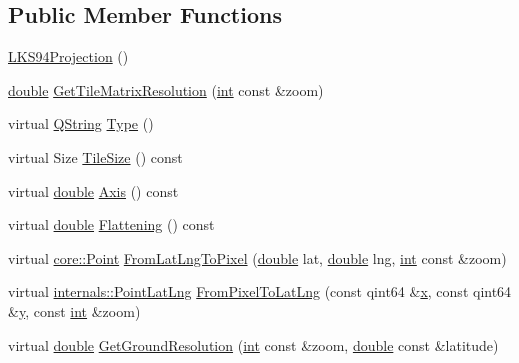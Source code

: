 \subsection*{Public Member Functions}
\begin{DoxyCompactItemize}
\item 
\hyperlink{group___o_p_map_widget_gacf511403f6a470bec942524c0e020b77}{L\-K\-S94\-Projection} ()
\item 
\hyperlink{_super_l_u_support_8h_a8956b2b9f49bf918deed98379d159ca7}{double} \hyperlink{group___o_p_map_widget_gade26ff9888d408a201247708930b7def}{Get\-Tile\-Matrix\-Resolution} (\hyperlink{ioapi_8h_a787fa3cf048117ba7123753c1e74fcd6}{int} const \&zoom)
\item 
virtual \hyperlink{group___u_a_v_objects_plugin_gab9d252f49c333c94a72f97ce3105a32d}{Q\-String} \hyperlink{group___o_p_map_widget_gae82b8ae052c2f26ea3a4c22e5874555a}{Type} ()
\item 
virtual Size \hyperlink{group___o_p_map_widget_ga86aa23efcf539805fb69e9ce24d807ec}{Tile\-Size} () const 
\item 
virtual \hyperlink{_super_l_u_support_8h_a8956b2b9f49bf918deed98379d159ca7}{double} \hyperlink{group___o_p_map_widget_gac4b990882512cc86ba637b3800236a67}{Axis} () const 
\item 
virtual \hyperlink{_super_l_u_support_8h_a8956b2b9f49bf918deed98379d159ca7}{double} \hyperlink{group___o_p_map_widget_ga16c229c3db71de0b79d22b6101b21d2d}{Flattening} () const 
\item 
virtual \hyperlink{structcore_1_1_point}{core\-::\-Point} \hyperlink{group___o_p_map_widget_gadd46e502fee5270e191688b136e895c9}{From\-Lat\-Lng\-To\-Pixel} (\hyperlink{_super_l_u_support_8h_a8956b2b9f49bf918deed98379d159ca7}{double} lat, \hyperlink{_super_l_u_support_8h_a8956b2b9f49bf918deed98379d159ca7}{double} lng, \hyperlink{ioapi_8h_a787fa3cf048117ba7123753c1e74fcd6}{int} const \&zoom)
\item 
virtual \hyperlink{structinternals_1_1_point_lat_lng}{internals\-::\-Point\-Lat\-Lng} \hyperlink{group___o_p_map_widget_gaeaf114d1ac8b52fc06bffdd1efd0ed24}{From\-Pixel\-To\-Lat\-Lng} (const qint64 \&\hyperlink{glext_8h_a1db9d104e3c2128177f26aff7b46982f}{x}, const qint64 \&\hyperlink{glext_8h_a42315f3ed8fff752bb47fd782309fcfc}{y}, const \hyperlink{ioapi_8h_a787fa3cf048117ba7123753c1e74fcd6}{int} \&zoom)
\item 
virtual \hyperlink{_super_l_u_support_8h_a8956b2b9f49bf918deed98379d159ca7}{double} \hyperlink{group___o_p_map_widget_ga8ec3073798d3fd7b19d1e62aac216fd7}{Get\-Ground\-Resolution} (\hyperlink{ioapi_8h_a787fa3cf048117ba7123753c1e74fcd6}{int} const \&zoom, \hyperlink{_super_l_u_support_8h_a8956b2b9f49bf918deed98379d159ca7}{double} const \&latitude)

\end{DoxyCompactItemize}
